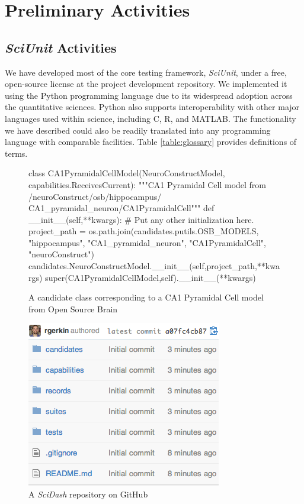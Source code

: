 \documentclass[11pt,letterpaper]{article}
\begin{document}
\section{Preliminary Activities}

\subsection{\textit{SciUnit} Activities} We have developed most of the core testing framework, \textit{SciUnit}, under a free, open-source license at the project development repository\cite{sciunit_url}.  We implemented it using the Python programming language\cite{python_url} due to its widespread adoption across the quantitative sciences. Python also supports interoperability with other major languages used within science, including C, R\cite{r_url}, and MATLAB\cite{matlab_url}. The functionality we have described could also be readily translated into any programming language with comparable facilities.  Table \ref{table:glossary} provides definitions of terms.  

\begin{figure}
\begin{python}
class CA1PyramidalCellModel(NeuroConstructModel,
				            capabilities.ReceivesCurrent):
	"""CA1 Pyramidal Cell model from /neuroConstruct/osb/hippocampus/
	CA1_pyramidal_neuron/CA1PyramidalCell"""
	def __init__(self,**kwargs):
		# Put any other initialization here.
		project_path = os.path.join(candidates.putils.OSB_MODELS,
									"hippocampus",
									"CA1_pyramidal_neuron",
									"CA1PyramidalCell",
									"neuroConstruct")
		candidates.NeuroConstructModel.__init__(self,project_path,**kwargs)
		super(CA1PyramidalCellModel,self).__init__(**kwargs)
\end{python}
\caption{A candidate class corresponding to a CA1 Pyramidal Cell model from Open Source Brain}
\label{fig:ca1_model}
\end{figure}

\begin{figure}
\includegraphics[scale=0.7]{scidash_github.png}
\caption{A \textit{SciDash} repository on GitHub}
\label{fig:scidash_repo}
\end{figure}
\leavevmode
{} 
\end{document}
